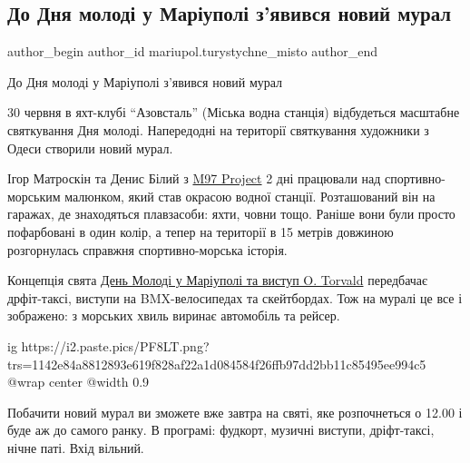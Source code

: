  
 
 
 
 

\subsection{До Дня молоді у Маріуполі з'явився новий мурал}
\label{sec:29_06_2019.fb.mariupol.turystychne_misto.1.den_molodi_novyj_mural}

\ifcmt
 author_begin
   author_id mariupol.turystychne_misto
 author_end
\fi

До Дня молоді у Маріуполі з'явився новий мурал

30 червня в яхт-клубі \enquote{Азовсталь} (Міська водна станція) відбудеться масштабне
святкування Дня молоді. Напередодні на території святкування художники з Одеси
створили новий мурал.

Ігор Матроскін та Денис Білий з \href{https://www.facebook.com/m97project}{M97 Project} 2 дні працювали над
спортивно-морським малюнком, який став окрасою водної станції. Розташований він
на гаражах, де знаходяться плавзасоби: яхти, човни тощо. Раніше вони були
просто пофарбовані в один колір, а тепер на території в 15 метрів довжиною
розгорнулась справжня спортивно-морська історія.

Концепція свята \href{https://www.facebook.com/events/2221152564658956}{День
Молоді у Маріуполі та виступ O. Torvald} передбачає дрфіт-таксі, виступи на
BMX-велосипедах та скейтбордах. Тож на муралі це все і зображено: з морських
хвиль виринає автомобіль та рейсер. 

\ifcmt
  ig https://i2.paste.pics/PF8LT.png?trs=1142e84a8812893e619f828af22a1d084584f26ffb97dd2bb11c85495ee994c5
  @wrap center
  @width 0.9
\fi

Побачити новий мурал ви зможете вже завтра на святі, яке розпочнеться о 12.00 і
буде аж до самого ранку. В програмі: фудкорт, музичні виступи, дріфт-таксі,
нічне паті. Вхід вільний.

